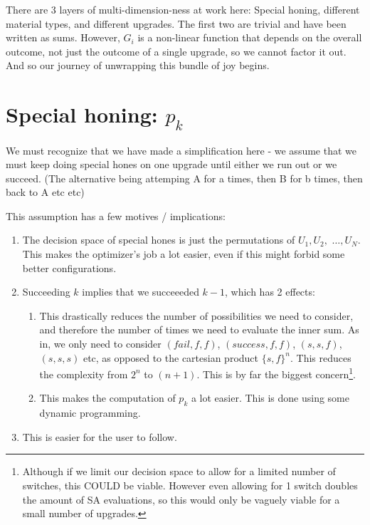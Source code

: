 \documentclass[a4paper,11pt]{article}
\begin{document}
There are 3 layers of multi-dimension-ness at work here: Special honing, different material types, and different upgrades. The first two are trivial and have been written as sums. However, $G_i$ is a non-linear function that depends on the overall outcome, not just the outcome of a single upgrade, so we cannot factor it out. And so our journey of unwrapping this bundle of joy begins.

\newpage
\section{Special honing: $p_k$}\label{special_section}

 We must recognize that we have made a simplification here - we assume that we must keep doing special hones on one upgrade until either we run out or we succeed. (The alternative being attemping A for a times, then B for b times, then back to A etc etc)


This assumption has a few motives / implications:
\begin{enumerate}

\item The decision space of special hones is just the permutations of $ U_1, U_2,$ $\ldots , U_N$. This makes the optimizer's job a lot easier, even if this might forbid some better configurations.
\item Succeeding $k$ implies that we succeeeded $k-1$, which has 2 effects:
\begin{enumerate}
  \item This drastically reduces the number of possibilities we need to consider, and therefore the number of times we need to evaluate the inner sum. As in, we only need to consider $(fail, f, f)$, $(success, f, f )$, $(s, s, f)$, $(s, s, s)$ etc, as opposed to the cartesian product $\{s,f\}^n$. This reduces the complexity from $2^n$ to $(n+1)$. This is by far the biggest concern\footnote{Although if we limit our decision space to allow for a limited number of switches, this COULD be viable. However even allowing for 1 switch doubles the amount of SA evaluations, so this would only be vaguely viable for a small number of upgrades.}.
  \item This makes the computation of $p_k$ a lot easier. This is done using some dynamic programming.
    \end{enumerate}
  \item This is easier for the user to follow.
  
\end{enumerate}
\end{document}
